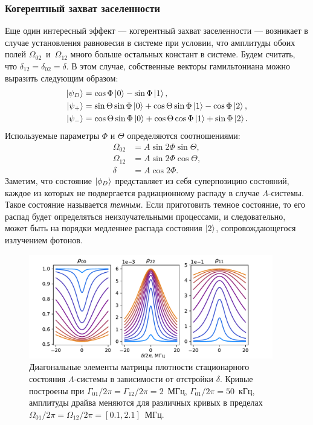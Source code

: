 \subsubsection{Когерентный захват заселенности}
Еще один интересный эффект --- когерентный захват заселенности --- возникает в случае установления равновесия в системе при условии, что амплитуды обоих полей $\Omega_{02}$~и~$\Omega_{12}$ много больше остальных констант в системе. Будем считать, что $\delta_{12}=\delta_{02}=\delta$. В этом случае, собственные векторы гамильтониана можно выразить следующим образом:
\begin{equation}
\begin{aligned}
\ket{\psi_D} &= \cos\Phi\ket{0} - \sin\Phi\ket{1}, \\
\ket{\psi_+} &= \sin\Theta\sin\Phi \ket{0} + \cos\Theta \sin \Phi\ket{1} -\cos\Phi \ket{2}, \\
\ket{\psi_-} &= \cos\Theta\sin\Phi\ket{0} + \cos\Theta\cos\Phi\ket{1} + \sin\Phi\ket{2}.
\end{aligned}
\end{equation}
Используемые параметры $\Phi$ и $\Theta$ определяются соотношениями:
\begin{equation}
\begin{aligned}
\Omega_{02} &= A\sin 2\Phi\sin\Theta, \\
\Omega_{12} &= A\sin 2\Phi \cos\Theta, \\
\delta &= A\cos 2\Phi. 
\end{aligned}
\end{equation}
Заметим, что состояние $\ket{\phi_D}$ представляет из себя суперпозицию состояний, каждое из которых не подвергается радиационному распаду в случае $\Lambda$-системы. Такое состояние называется \textit{темным}. Если приготовить темное состояние, то его распад будет определяться неизлучательными процессами, и следовательно, может быть на порядки медленнее распада состояния $\ket{2}$, сопровождающегося излучением фотонов.
\begin{figure}[h]
	\centering
	\includegraphics[width=0.95\textwidth]{images/CPT_plot_small.pdf}	 
	\caption[Когерентный захват заселенности в $\Lambda$-системе]{Диагональные элементы матрицы плотности стационарного состояния $\Lambda$-системы в зависимости от отстройки $\delta$. Кривые построены при $\Gamma_{01}/2\pi=\Gamma_{12}/2\pi = 2$~МГц, $\Gamma_{01}/2\pi=50$~кГц, амплитуды драйва меняются для различных кривых в пределах $\Omega_{01}/2\pi=\Omega_{12}/2\pi = [0.1, 2.1]$~МГц.}
	\label{img: CPT_plot}
\end{figure}
